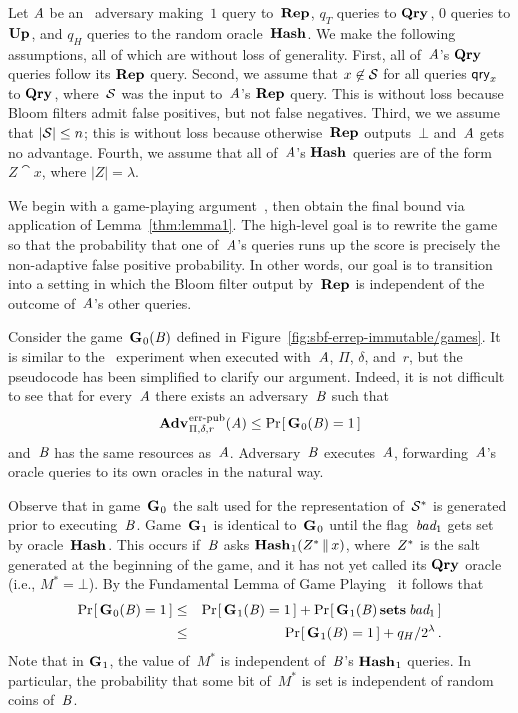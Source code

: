 Let $\mathit{A}$ be an \errep\ adversary making~$1$ query to~$\textup{\textbf{Rep}}\hspace{0.5pt}$, $q_T$ queries
to $\textup{\textbf{Qry}}\hspace{0.5pt}$, $0$ queries to $\textup{\textbf{Up}}\hspace{0.5pt}$, and $q_H$ queries to the random
oracle~$\textup{\textbf{Hash}}\hspace{0.5pt}$.
%
We make the following assumptions, all of which are without loss of generality.
%
First, all of~$\mathit{A}$'s $\textup{\textbf{Qry}}\hspace{0.5pt}$ queries follow its $\textup{\textbf{Rep}}\hspace{0.5pt}$ query.
%
Second, we assume that $x\not\in\mathcal{S}$ for all queries $\mathsf{qry}_x$ to $\textup{\textbf{Qry}}\hspace{0.5pt}$,
where~$\mathcal{S}$ was the input to~$\mathit{A}$'s $\textup{\textbf{Rep}}\hspace{0.5pt}$ query. This is without loss
because Bloom filters admit false positives, but not false negatives.
%
Third, we we assume that $|\mathcal{S}| \leq n$; this is without loss because
otherwise~$\textup{\textbf{Rep}}\hspace{0.5pt}$ outputs~$\bot$ and~$\mathit{A}$ gets no advantage.
%
Fourth, we assume that all of~$\mathit{A}$'s $\textup{\textbf{Hash}}\hspace{0.5pt}$ queries are of the form $Z\cat
x$, where $|Z| = \lambda$.

We begin with a game-playing argument~\cite{bellare2006triple}, then obtain the
final bound via application of Lemma~\ref{thm:lemma1}.
%
The high-level goal is to rewrite the game so that the probability that one
of~$\mathit{A}$'s queries runs up the score is precisely the non-adaptive false
positive probability.
%
In other words, our goal is to transition into a setting in which the Bloom
filter output by~$\textup{\textbf{Rep}}\hspace{0.5pt}$ is independent of the outcome of~$\mathit{A}$'s other
queries.

Consider the game~$\textup{\textbf{G}}\hspace{0.5pt}_0(\mathit{B})$ defined in
Figure~\ref{fig:sbf-errep-immutable/games}. It is similar to the \errep\
experiment when executed with~$\mathit{A}$, $\Pi$, $\delta$, and~$r$, but the
pseudocode has been simplified to clarify our argument. Indeed, it is not
difficult to see that for every~$\mathit{A}$ there exists an adversary~$\mathit{B}$ such
that
\begin{equation}
  \Adv{\errep}_{\Pi,\delta,r}(\advA) \leq \Prob{\game_0(\advB) = 1}
\end{equation}
and~$\mathit{B}$ has the same resources as~$\mathit{A}$.
%
Adversary~$\mathit{B}$ executes~$\mathit{A}$, forwarding~$\mathit{A}$'s oracle queries
to its own oracles in the natural way.

Observe that in game~$\textup{\textbf{G}}\hspace{0.5pt}_0$ the salt used for the representation of~$\mathcal{S}^*$
is generated prior to executing~$\mathit{B}$. Game~$\textup{\textbf{G}}\hspace{0.5pt}_1$ is identical
to~$\textup{\textbf{G}}\hspace{0.5pt}_0$ until the flag~$\textit{bad}_1$ gets set by oracle~$\textup{\textbf{Hash}}\hspace{0.5pt}$. This occurs
if~$\mathit{B}$ asks $\textup{\textbf{Hash}}\hspace{0.5pt}_1(Z^* \, \| \, x)$, where~$Z^*$ is the salt generated
at the beginning of the game, and it has not yet called its $\textup{\textbf{Qry}}\hspace{0.5pt}$ oracle (i.e.,
$M^*=\bot$).
%
By the Fundamental Lemma of Game Playing~\cite{bellare2006triple} it follows
that
%
\begin{eqnarray}
  \Pr\hspace{-1pt}\left[\,\textup{\textbf{G}}\hspace{0.5pt}_0(\mathit{B})=1\,\right] &\leq&
    \Pr\hspace{-1pt}\left[\,\textup{\textbf{G}}\hspace{0.5pt}_1(\mathit{B})=1\,\right] + \Pr\hspace{-1pt}\left[\,\textup{\textbf{G}}\hspace{0.5pt}_1(\mathit{B}) \,\textup{\textbf{sets}}\hspace{0.5pt}\, \textit{bad}_1\,\right]\\
  &\leq&
    \Pr\hspace{-1pt}\left[\,\textup{\textbf{G}}\hspace{0.5pt}_1(\mathit{B})=1\,\right] + q_H/2^\lambda \,.
\end{eqnarray}
%
Note that in $\textup{\textbf{G}}\hspace{0.5pt}_1$, the value of~$M^*$ is independent of~$\mathit{B}$'s
$\textup{\textbf{Hash}}\hspace{0.5pt}_1$ queries. In particular, the probability that some bit of~$M^*$ is set
is independent of random coins of~$\mathit{B}$.

